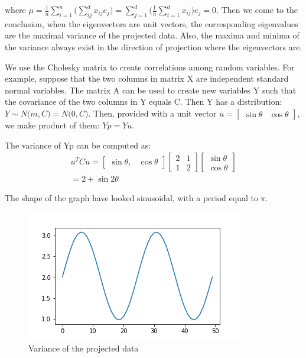 \documentclass[10pt]{article}
\begin{document}
where $\mu=\frac{1}{n}\sum_{i=1}^{n} \big( \sum_{ij}^d x_{ij}e_j \big) =  \sum_{j=1}^d  \big( \frac{1}{n} \sum_{i=1}^d x_{ij}\big)e_j =0 $. Then we come to the conclusion, when the eigenvectors are unit vectors, the corresponding eigenvalues are the maximal variance of the projected data. Also, the maxima and minima of the variance always exist in the direction of projection where the eigenvectors are.

We use the Cholesky matrix to create correlations among random variables. For example, suppose that the two columns in matrix X are independent standard normal variables. The matrix A can be used to create new variables Y such that the covariance of the two columns in Y equals C. Then Y has a distribution:$Y \sim N \big(m,C\big) =N\big(0,C\big)$. Then, provided with a unit vector $u= \begin{bmatrix}\sin\theta & \cos\theta \end{bmatrix} $, we make product of them: $Yp = Yu$.

The variance of Yp can be computed as:
\begin{equation}
\begin{aligned}
      u^TCu =  \begin{bmatrix}\sin\theta ,& \cos\theta \end{bmatrix} \begin{bmatrix}2 & 1 \\ 1 & 2 \end{bmatrix} \begin{bmatrix}\sin\theta \\ \cos\theta \end{bmatrix} \\
      = 2 + \sin{2\theta}
\end{aligned}
\end{equation}

The shape of the graph have looked sinusoidal, with a period equal to $\pi$.


\begin{figure}
\centering 
\vspace{-5mm}
\hspace{20mm}
\includegraphics[width=0.7\linewidth]{varianceOfTheProjectedData.png} 
\caption{\footnotesize  Variance of the projected data}
\centering
\end{figure}
\end{document}
